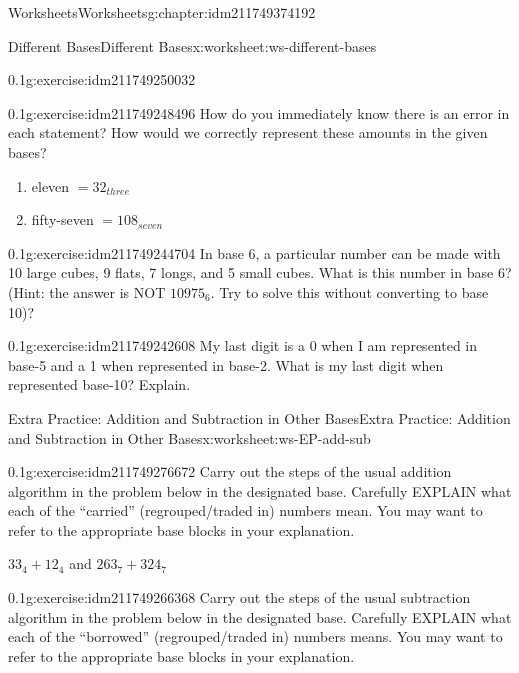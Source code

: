 \documentclass[twoside,11pt,]{book}
\begin{document}
\begin{chapterptx}{Worksheets}{}{Worksheets}{}{}{g:chapter:idm211749374192}
\begin{worksheet-section-numberless}{Different Bases}{}{Different Bases}{}{}{x:worksheet:ws-different-bases}
\begin{divisionexercise}{4}{}{0.1}{g:exercise:idm211749250032}
\end{divisionexercise}%
\begin{divisionexercise}{5}{}{0.1}{g:exercise:idm211749248496}%
How do you immediately know there is an error in each statement?  How would we correctly represent these amounts in the given bases?%
%
\begin{enumerate}[label=(\alph*)]
\item{}eleven \(= 32_{three}\)%
\item{}fifty-seven \(= 108_{seven}\)%
\end{enumerate}
\end{divisionexercise}%
\begin{divisionexercise}{6}{}{0.1}{g:exercise:idm211749244704}%
In base 6, a particular number can be made with 10 large cubes, 9 flats, 7 longs, and 5 small cubes.  What is this number in base 6? (Hint: the answer is NOT \(10975_6 \). Try to solve this without converting to base 10)?%
\end{divisionexercise}%
\begin{divisionexercise}{7}{}{0.1}{g:exercise:idm211749242608}%
My last digit is a 0 when I am represented in base-5 and a 1 when represented in base-2.  What is my last digit when represented base-10? Explain.%
\end{divisionexercise}%
\end{worksheet-section-numberless}
\restoregeometry
%
%
\typeout{************************************************}
\typeout{************************************************}
%
\begin{worksheet-section-numberless}{Extra Practice: Addition and Subtraction in Other Bases}{}{Extra Practice: Addition and Subtraction in Other Bases}{}{}{x:worksheet:ws-EP-add-sub}
\begin{divisionexercise}{1}{}{0.1}{g:exercise:idm211749276672}%
Carry out the steps of the usual addition algorithm in the problem below in the designated base.  Carefully EXPLAIN what each of the “carried” (regrouped\slash{}traded in) numbers mean.  You may want to refer to the appropriate base blocks in your explanation.%
\par
\(33_4+12_4\) and \(263_7+324_7\)%
\end{divisionexercise}%
\begin{divisionexercise}{2}{}{0.1}{g:exercise:idm211749266368}%
Carry out the steps of the usual subtraction algorithm in the problem below in the designated base.  Carefully EXPLAIN what each of the “borrowed” (regrouped\slash{}traded in) numbers means.  You may want to refer to the appropriate base blocks in your explanation.%

\end{divisionexercise}
\end{worksheet-section-numberless}
\end{chapterptx}
\end{document}
